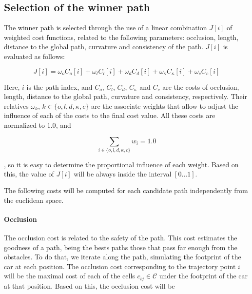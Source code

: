 \subsection{Selection of the winner path}\label{ch:chapter07_01_04}

The winner path is selected through the use of a linear combination $J[i]$ of weighted cost functions, related to the following parameters: occlusion, length, distance to the global path, curvature and consistency of the path. $J[i]$ is evaluated as follows:

\begin{equation}\label{eq:cp07_cost_function}
J[i] = \omega_o C_o[i] + \omega_l C_l[i] + \omega_d C_d[i] + \omega_{\kappa} C_{\kappa}[i] + \omega_c C_c[i]
\end{equation}

Here, $i$ is the path index, and $C_o$, $C_l$, $C_d$, $C_{\kappa}$ and $C_c$ are the costs of occlusion, length, distance to the global path, curvature and consistency, respectively. Their relatives $\omega_k$, $k \in \{o, l, d, \kappa, c\}$ are the associate weights that allow to adjust the influence of each of the costs to the final cost value. All these costs are normalized to $1.0$, and 

\begin{equation}\label{eq:cp07_weights_sum}
\sum_{{i \in \{o, l, d, \kappa, c\}}} w_i= 1.0
\end{equation}

, so it is easy to determine the proportional influence of each weight. Based on this, the value of $J[i]$ will be always inside the interval $[0\dots1]$.

The following costs will be computed for each candidate path independently from the euclidean space.

\paragraph{Occlusion}\label{ch:chapter07_01_04_00_01}

The occlusion cost is related to the safety of the path. This cost estimates the goodness of a path, being the bests paths those that pass far enough from the obstacles. To do that, we iterate along the path, simulating the footprint of the car at each position. The occlusion cost corresponding to the trajectory point $i$ will be the maximal cost of each of the cells $c_{ij} \in \mathcal{C}$ under the footprint of the car at that position. Based on this, the occlusion cost will be

